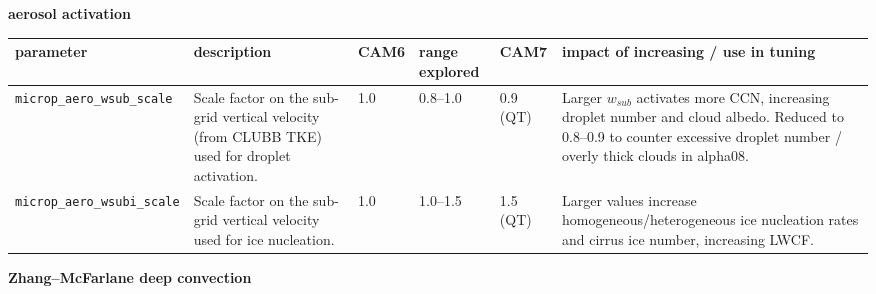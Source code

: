\documentclass[draft]{agujournal2019}
\begin{document}
\newpage
\noindent\textbf{aerosol activation}
\medskip

\scriptsize
 \begin{tabular}{p{2.3cm} p{3.1cm} p{0.9cm} p{1.8cm} p{1.0cm} p{4.2cm}}
  \hline
 parameter & description & CAM6 & range explored & CAM7 & impact of increasing / use in tuning \\
 \hline  \hline
\texttt{microp\_\allowbreak aero\_\allowbreak wsub\_\allowbreak scale} &
Scale factor on the sub-grid vertical velocity (from CLUBB TKE) used for
droplet activation. &
1.0 & 0.8--1.0 & 0.9 (QT) &
Larger $w_{sub}$ activates more CCN, increasing droplet number and cloud
albedo. Reduced to 0.8--0.9 to counter excessive droplet number / overly
thick clouds in alpha08. \\

\texttt{microp\_\allowbreak aero\_\allowbreak wsubi\_\allowbreak scale} &
Scale factor on the sub-grid vertical velocity used for ice nucleation. &
1.0 & 1.0--1.5 & 1.5 (QT) &
Larger values increase homogeneous/heterogeneous ice nucleation rates and
cirrus ice number, increasing LWCF. \\
 \hline
 \hline
 \end{tabular}
\normalsize


\newpage
\noindent\textbf{Zhang--McFarlane deep convection}
\medskip
\end{document}
